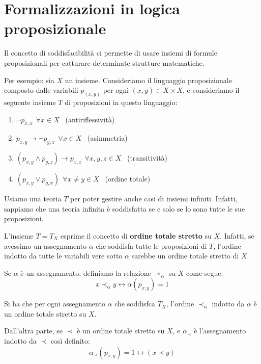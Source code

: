 \documentclass[a4paper,11pt]{report}
\begin{document}
\section{Formalizzazioni in logica proposizionale}

Il concetto di soddisfacibilità ci permette di usare insiemi di formule proposizionali per catturare determinate strutture matematiche.

Per esempio: sia \( X \) un insieme. Consideriamo il linguaggio proposizionale composto dalle variabili \(p_{(x, y)}  \) per ogni \( (x,y) \in X \times X\), e consideriamo il seguente insieme \( T \) di proposizioni in questo linguaggio:

\begin{enumerate}
    \item \( \neg p_{x,x} \ \ \forall x \in X\) \ {\color{gray}(antiriflessività)}
    \item \( p_{x, y} \to \neg p_{y,x} \ \   \forall x \in X\) \ {\color{gray}(asimmetria)}
    \item \( (p_{x, y} \land p_{y, z}) \to p_{x, z} \ \ \forall x, y, z \in X\) \ {\color{gray}(transitività)}
\item \( (p_{x, y} \lor p_{y, x}) \  \ \forall x \neq  y \in X\) \ {\color{gray}(ordine totale)}
\end{enumerate}

Usiamo una teoria \( T \) per poter gestire anche casi di insiemi infiniti. Infatti, sappiamo che una teoria infinita è soddisfatta se e solo se lo sono tutte le sue proposizioni.

L'insieme \( T = T_X \) esprime il concetto di \textbf{ordine totale stretto} su \( X \). Infatti, se avessimo un assegnamento \( \alpha \) che soddisfa tutte le proposizioni di \( T \), l'ordine indotto da tutte le variabili vere sotto \( \alpha \) sarebbe un ordine totale stretto di \( X  \).

Se \( \alpha \) è un assegnamento, definiamo la relazione \( \prec_{\alpha} \) su \( X \) come segue:
\[ x \prec_\alpha y \leftrightarrow \alpha(p_{x,y})=1 \]

Si ha che per ogni assegnamento \( \alpha \) che soddisfca \( T_X \), l'ordine \( \prec_\alpha \) indotto da \( \alpha \) è un ordine totale stretto su \( X \).

Dall'altra parte, se \( \prec \) è un ordine totale stretto su \( X \), e \( \alpha_\prec \) è l'assegnamento indotto da \( \prec \) così definito:
\[ \alpha_\prec (p_{x,y}) = 1 \leftrightarrow (x \prec y) \]
\end{document}
